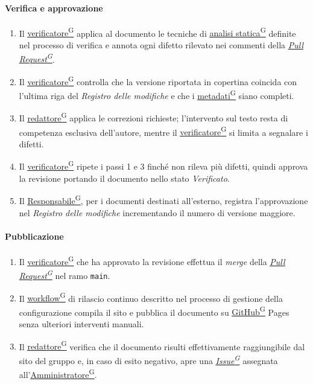 \documentclass[a4paper,12pt]{article}
\providecommand{\glslink}[2]{\href{https://alittlebyte-19.github.io/Documentazione/glossario.html\#gls-#1}{\underline{#2}\textsuperscript{\scriptsize G}}}
\begin{document}
\paragraph{Verifica e approvazione}
\begin{enumerate}
    \item Il \glslink{verificatore}{verificatore} applica al documento le tecniche di \glslink{analisi-statica}{analisi statica} definite nel processo di verifica e annota ogni difetto rilevato nei commenti della \textit{\glslink{pull-request}{Pull Request}}.
    \item Il \glslink{verificatore}{verificatore} controlla che la versione riportata in copertina coincida con l'ultima riga del \textit{Registro delle modifiche} e che i \glslink{metadati}{metadati} siano completi.
    \item Il \glslink{redattore}{redattore} applica le correzioni richieste; l'intervento sul testo resta di competenza esclusiva dell'autore, mentre il \glslink{verificatore}{verificatore} si limita a segnalare i difetti.
    \item Il \glslink{verificatore}{verificatore} ripete i passi 1 e 3 finché non rileva più difetti, quindi approva la revisione portando il documento nello stato \textit{Verificato}.
    \item Il \glslink{responsabile}{Responsabile}, per i documenti destinati all'esterno, registra l'approvazione nel \textit{Registro delle modifiche} incrementando il numero di versione maggiore.
\end{enumerate}

\paragraph{Pubblicazione}
\begin{enumerate}
    \item Il \glslink{verificatore}{verificatore} che ha approvato la revisione effettua il \textit{merge} della \textit{\glslink{pull-request}{Pull Request}} nel ramo \texttt{main}.
    \item Il \glslink{workflow}{workflow} di rilascio continuo descritto nel processo di gestione della configurazione compila il sito e pubblica il documento su \glslink{github}{GitHub} Pages senza ulteriori interventi manuali.
    \item Il \glslink{redattore}{redattore} verifica che il documento risulti effettivamente raggiungibile dal sito del gruppo e, in caso di esito negativo, apre una \textit{\glslink{issue}{Issue}} assegnata all'\glslink{amministratore}{Amministratore}.
\end{enumerate}
\end{document}
